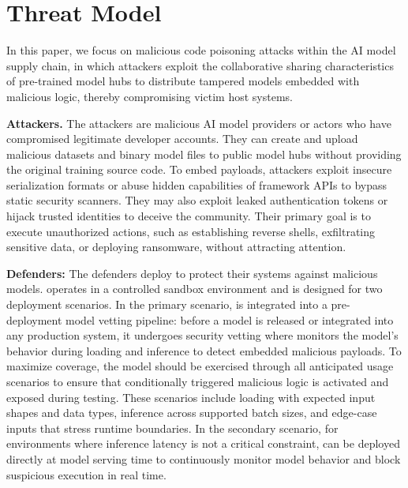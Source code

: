\section{Threat Model}
\label{sec:threatmodel}

In this paper, we focus on malicious code poisoning attacks within the AI model supply chain, in which attackers exploit the collaborative sharing characteristics of pre-trained model hubs to distribute tampered models embedded with malicious logic, thereby compromising victim host systems.

\noindent \textbf{Attackers.} The attackers are malicious AI model providers or actors who have compromised legitimate developer accounts\cite{10754708}. They can create and upload malicious datasets and binary model files to public model hubs without providing the original training source code. To embed payloads, attackers exploit insecure serialization formats\cite{liu2025arthideseekmaking} or abuse hidden capabilities of framework APIs\cite{zhu2025} to bypass static security scanners. They may also exploit leaked authentication tokens or hijack trusted identities to deceive the community\cite{3773117}. Their primary goal is to execute unauthorized actions, such as establishing reverse shells, exfiltrating sensitive data, or deploying ransomware, without attracting attention.

\noindent \textbf{Defenders:} The defenders deploy \toolname{} to protect their systems against malicious models. \toolname{} operates in a controlled sandbox environment and is designed for two deployment scenarios. In the primary scenario, \toolname{} is integrated into a pre-deployment model vetting pipeline: before a model is released or integrated into any production system, it undergoes security vetting where \toolname{} monitors the model's behavior during loading and inference to detect embedded malicious payloads. To maximize coverage, the model should be exercised through all anticipated usage scenarios to ensure that conditionally triggered malicious logic is activated and exposed during testing\cite{11029791, zhang2025fixexploitenablingcomprehensive}. These scenarios include loading with expected input shapes and data types, inference across supported batch sizes, and edge-case inputs that stress runtime boundaries. In the secondary scenario, for environments where inference latency is not a critical constraint, \toolname{} can be deployed directly at model serving time to continuously monitor model behavior and block suspicious execution in real time.